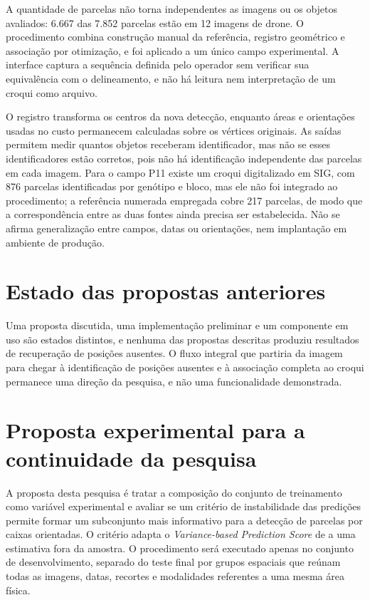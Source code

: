 A quantidade de parcelas n\~ao torna independentes as imagens ou os objetos avaliados: 6.667 das 7.852 parcelas est\~ao em 12 imagens de drone. O procedimento combina constru\c{c}\~ao manual da refer\^encia, registro geom\'etrico e associa\c{c}\~ao por otimiza\c{c}\~ao, e foi aplicado a um \'unico campo experimental. A interface captura a sequ\^encia definida pelo operador sem verificar sua equival\^encia com o delineamento, e n\~ao h\'a leitura nem interpreta\c{c}\~ao de um croqui como arquivo.

O registro transforma os centros da nova detec\c{c}\~ao, enquanto \'areas e orienta\c{c}\~oes usadas no custo permanecem calculadas sobre os v\'ertices originais. As sa\'idas permitem medir quantos objetos receberam identificador, mas n\~ao se esses identificadores est\~ao corretos, pois n\~ao h\'a identifica\c{c}\~ao independente das parcelas em cada imagem. Para o campo P11 existe um croqui digitalizado em SIG, com 876 parcelas identificadas por gen\'otipo e bloco, mas ele n\~ao foi integrado ao procedimento; a refer\^encia numerada empregada cobre 217 parcelas, de modo que a correspond\^encia entre as duas fontes ainda precisa ser estabelecida. N\~ao se afirma generaliza\c{c}\~ao entre campos, datas ou orienta\c{c}\~oes, nem implanta\c{c}\~ao em ambiente de produ\c{c}\~ao.

\section{Estado das propostas anteriores}
\label{sec:estado-propostas-anteriores}

Uma proposta discutida, uma implementa\c{c}\~ao preliminar e um componente em uso s\~ao estados distintos, e nenhuma das propostas descritas produziu resultados de recupera\c{c}\~ao de posi\c{c}\~oes ausentes. O fluxo integral que partiria da imagem para chegar \`a identifica\c{c}\~ao de posi\c{c}\~oes ausentes e \`a associa\c{c}\~ao completa ao croqui permanece uma dire\c{c}\~ao da pesquisa, e n\~ao uma funcionalidade demonstrada.

\section{Proposta experimental para a continuidade da pesquisa}
\label{sec:proposta-experimental-continuidade}

A proposta desta pesquisa \'e tratar a composi\c{c}\~ao do conjunto de treinamento como vari\'avel experimental e avaliar se um crit\'erio de instabilidade das predi\c{c}\~oes permite formar um subconjunto mais informativo para a detec\c{c}\~ao de parcelas por caixas orientadas. O crit\'erio adapta o \textit{Variance-based Prediction Score} de \citet{yagi2025} a uma estimativa fora da amostra. O procedimento ser\'a executado apenas no conjunto de desenvolvimento, separado do teste final por grupos espaciais que re\'unam todas as imagens, datas, recortes e modalidades referentes a uma mesma \'area f\'isica.

